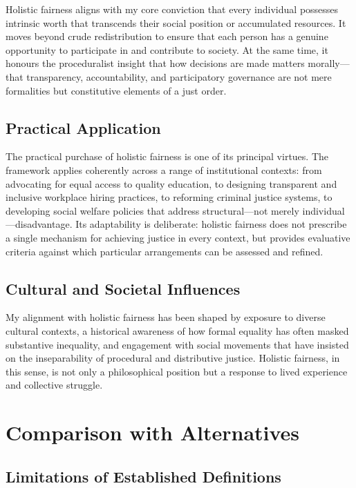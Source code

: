 \documentclass[11pt,showkeys]{../../shared/essay}
\begin{document}
Holistic fairness aligns with my core conviction that every individual possesses intrinsic worth
that transcends their social position or accumulated resources. It moves beyond crude
redistribution to ensure that each person has a genuine opportunity to participate in and
contribute to society. At the same time, it honours the proceduralist insight that how decisions
are made matters morally---that transparency, accountability, and participatory governance are
not mere formalities but constitutive elements of a just order.

\subsection{Practical Application}

The practical purchase of holistic fairness is one of its principal virtues. The framework
applies coherently across a range of institutional contexts: from advocating for equal access to
quality education, to designing transparent and inclusive workplace hiring practices, to
reforming criminal justice systems, to developing social welfare policies that address
structural---not merely individual---disadvantage. Its adaptability is deliberate: holistic
fairness does not prescribe a single mechanism for achieving justice in every context, but
provides evaluative criteria against which particular arrangements can be assessed and refined.

\subsection{Cultural and Societal Influences}

My alignment with holistic fairness has been shaped by exposure to diverse cultural contexts,
a historical awareness of how formal equality has often masked substantive inequality, and
engagement with social movements that have insisted on the inseparability of procedural and
distributive justice. Holistic fairness, in this sense, is not only a philosophical position but a
response to lived experience and collective struggle.

\section{Comparison with Alternatives}

\subsection{Limitations of Established Definitions}
\end{document}
